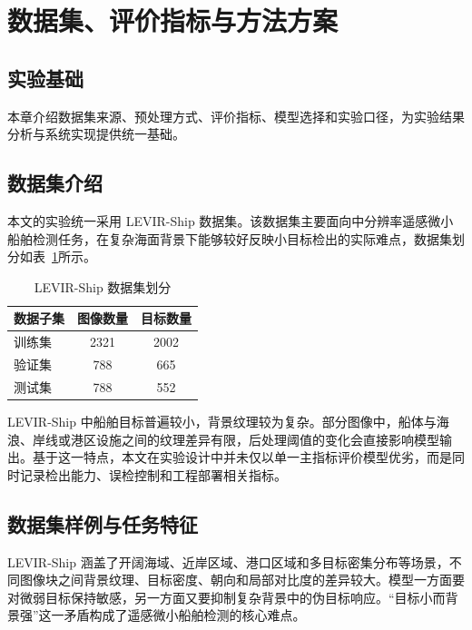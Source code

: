 \section{数据集、评价指标与方法方案}\label{sec:method}

\subsection{实验基础}

本章介绍数据集来源、预处理方式、评价指标、模型选择和实验口径，为实验结果分析与系统实现提供统一基础。

\subsection{数据集介绍}

本文的实验统一采用 LEVIR-Ship 数据集\cite{chen2022_tinyship_drenet}。该数据集主要面向中分辨率遥感微小船舶检测任务，在复杂海面背景下能够较好反映小目标检出的实际难点，数据集划分如表~\ref{tab:ch3_dataset_split}所示。

\begin{table}[htbp]
  \centering
  \caption{LEVIR-Ship 数据集划分}
  \label{tab:ch3_dataset_split}
  \begin{tabular}{lcc}
    \toprule
    数据子集 & 图像数量 & 目标数量 \\
    \midrule
    训练集 & 2321 & 2002 \\
    验证集 & 788 & 665 \\
    测试集 & 788 & 552 \\
    \bottomrule
  \end{tabular}
\end{table}

LEVIR-Ship 中船舶目标普遍较小，背景纹理较为复杂。部分图像中，船体与海浪、岸线或港区设施之间的纹理差异有限，后处理阈值的变化会直接影响模型输出。基于这一特点，本文在实验设计中并未仅以单一主指标评价模型优劣，而是同时记录检出能力、误检控制和工程部署相关指标。

\subsection{数据集样例与任务特征}

LEVIR-Ship 涵盖了开阔海域、近岸区域、港口区域和多目标密集分布等场景，不同图像块之间背景纹理、目标密度、朝向和局部对比度的差异较大。模型一方面要对微弱目标保持敏感，另一方面又要抑制复杂背景中的伪目标响应。“目标小而背景强”这一矛盾构成了遥感微小船舶检测的核心难点。

